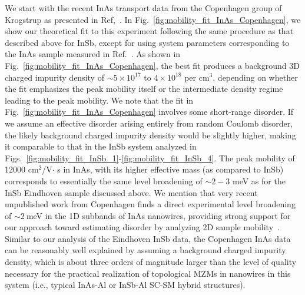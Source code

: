\documentclass[aps,prmaterials,twocolumn,superscriptaddress,longbibliography]{revtex4-2}
\begin{document}
We start with the recent InAs transport data from the Copenhagen group of Krogstrup as presented in Ref,~.  In Fig.~\ref{fig:mobility_fit_InAs_Copenhagen}, we show our theoretical fit to this experiment following the same procedure as that described above for InSb, except for using system parameters corresponding to the InAs sample measured in Ref.~. 
 As shown in Fig.~\ref{fig:mobility_fit_InAs_Copenhagen}, the best fit  produces a background 3D charged impurity density of $ \sim 5\times10^{17} $  to $ 4\times10^{18} $ per cm$ ^3 $,  depending on whether the fit emphasizes the peak mobility itself or the intermediate density regime leading to the peak mobility.  We note that the fit in Fig.~\ref{fig:mobility_fit_InAs_Copenhagen}  involves some short-range disorder.  If we assume an effective disorder arising entirely from random Coulomb disorder, the likely background charged impurity density would be slightly higher, making it comparable to that in the InSb system analyzed in Figs.~\ref{fig:mobility_fit_InSb_1}-\ref{fig:mobility_fit_InSb_4}.  The peak mobility of 12000 cm$ ^2 $/V$ \cdot $ s in InAs, with its higher effective mass (as compared to InSb) corresponds to essentially the same level broadening of $ \sim 2-3 $  meV as for the InSb Eindhoven sample discussed above.  We mention that very recent unpublished work from Copenhagen finds a direct experimental level broadening of $ \sim 2~$meV in the 1D subbands of InAs nanowires, providing strong support for our approach toward estimating disorder by analyzing 2D sample mobility~\cite{private_Cui}.  Similar to our analysis of the Eindhoven InSb data, the Copenhagen InAs data can be reasonably well explained by assuming a background charged impurity density, which is about three orders of magnitude larger than the level of quality necessary for the practical realization of topological MZMs in nanowires in this system (i.e., typical InAs-Al or InSb-Al SC-SM hybrid structures). 
\end{document}
